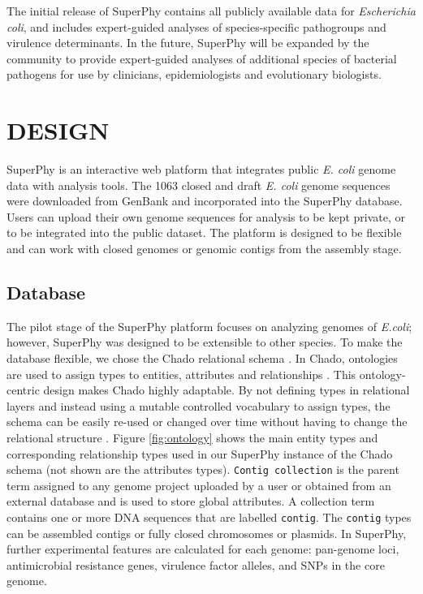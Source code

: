 \documentclass[a4paper,twoside]{article}
\begin{document}
The initial release of SuperPhy contains all publicly available data for \textit{Escherichia coli}, and includes expert-guided analyses of species-specific pathogroups and virulence determinants. In the future, SuperPhy will be expanded by the community to provide expert-guided analyses of additional species of bacterial pathogens for use by clinicians, epidemiologists and evolutionary biologists.

\section{\uppercase{Design}}
\label{sec:design}

\noindent SuperPhy is an interactive web platform that integrates public \textit{E. coli} genome data with analysis tools. The 1063 closed and draft \textit{E. coli} genome sequences were downloaded from GenBank and incorporated into the SuperPhy database. Users can upload their own genome sequences for analysis to be kept private, or to be integrated into the public dataset. The platform is designed to be flexible and can work with closed genomes or genomic contigs from the assembly stage. 

\subsection{Database}

The pilot stage of the SuperPhy platform focuses on analyzing genomes of \textit{E.coli}; however, SuperPhy was designed to be extensible to other species. To make the database flexible, we chose the Chado relational schema \cite{mungall2007chado}. In Chado, ontologies are used to assign types to entities, attributes and relationships \cite{mungall2007chado}. This ontology-centric design makes Chado highly adaptable. By not defining types in relational layers and instead using a mutable controlled vocabulary to assign types, the schema can be easily re-used or changed over time without having to change the relational structure \cite{mungall2007chado}.  Figure \ref{fig:ontology} shows the main entity types and corresponding relationship types used in our SuperPhy instance of the Chado schema (not shown are the attributes types). \texttt{Contig collection} is the parent term assigned to any genome project uploaded by a user or obtained from an external database and is used to store global attributes. A collection term contains one or more DNA sequences that are labelled \texttt{contig}. The \texttt{contig} types can be assembled contigs or fully closed chromosomes or plasmids. In SuperPhy, further experimental features are calculated for each genome: pan-genome loci, antimicrobial resistance genes, virulence factor alleles, and SNPs in the core genome.
\end{document}
